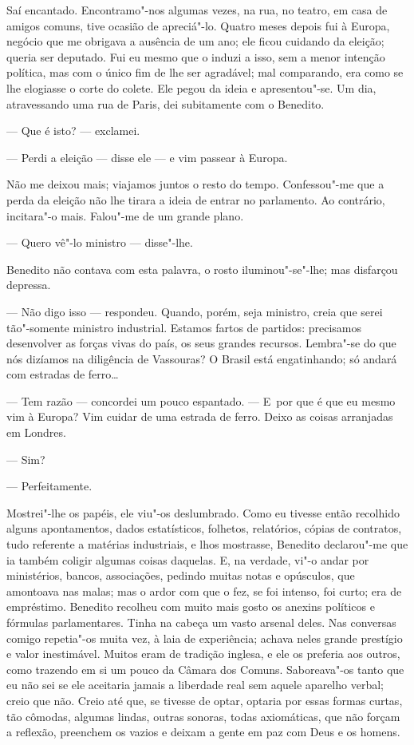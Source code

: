 \begin{linenumbers}
Saí encantado. Encontramo"-nos algumas vezes, na rua, no teatro, em casa
de amigos comuns, tive ocasião de apreciá"-lo. Quatro meses depois fui à
Europa, negócio que me obrigava a ausência de um ano; ele ficou cuidando
da eleição; queria ser deputado. Fui eu mesmo que o induzi a isso, sem a
menor intenção política, mas com o único fim de lhe ser agradável; mal
comparando, era como se lhe elogiasse o corte do colete. Ele pegou da
ideia e apresentou"-se. Um dia, atravessando uma rua de Paris, dei
subitamente com o Benedito.

--- Que é isto? --- exclamei.

--- Perdi a eleição --- disse ele --- e vim passear à Europa.

Não me deixou mais; viajamos juntos o resto do tempo. Confessou"-me que a
perda da eleição não lhe tirara a ideia de entrar no parlamento. Ao
contrário, incitara"-o mais. Falou"-me de um grande plano.

--- Quero vê"-lo ministro --- disse"-lhe.

Benedito não contava com esta palavra, o rosto iluminou"-se"-lhe; mas
disfarçou depressa.

--- Não digo isso --- respondeu. Quando, porém, seja ministro, creia que
serei tão"-somente ministro industrial. Estamos fartos de partidos:
precisamos desenvolver as forças vivas do país, os seus grandes
recursos. Lembra"-se do que nós dizíamos na diligência de Vassouras? O
Brasil está engatinhando; só andará com estradas de ferro\ldots{}

--- Tem razão --- concordei um pouco espantado. --- E~por que é que eu
mesmo vim à Europa? Vim cuidar de uma estrada de ferro. Deixo as coisas
arranjadas em Londres.

--- Sim?

--- Perfeitamente.

Mostrei"-lhe os papéis, ele viu"-os deslumbrado. Como eu tivesse então
recolhido alguns apontamentos, dados estatísticos, folhetos, relatórios,
cópias de contratos, tudo referente a matérias industriais, e lhos
mostrasse, Benedito declarou"-me que ia também coligir algumas coisas
daquelas. E, na verdade, vi"-o andar por ministérios, bancos,
associações, pedindo muitas notas e opúsculos, que amontoava nas malas;
mas o ardor com que o fez, se foi intenso, foi curto; era de empréstimo.
Benedito recolheu com muito mais gosto os anexins políticos e fórmulas
parlamentares. Tinha na cabeça um vasto arsenal deles. Nas conversas
comigo repetia"-os muita vez, à laia de experiência; achava neles grande
prestígio e valor inestimável. Muitos eram de tradição inglesa, e ele os
preferia aos outros, como trazendo em si um pouco da Câmara dos Comuns.
Saboreava"-os tanto que eu não sei se ele aceitaria jamais a liberdade
real sem aquele aparelho verbal; creio que não. Creio até que, se
tivesse de optar, optaria por essas formas curtas, tão cômodas, algumas
lindas, outras sonoras, todas axiomáticas, que não forçam a reflexão,
preenchem os vazios e deixam a gente em paz com Deus e os homens.


\end{linenumbers}

